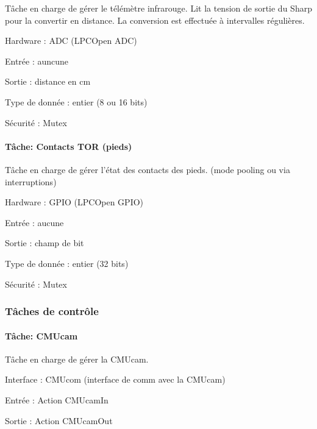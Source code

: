 Tâche en charge de gérer le télémètre infrarouge. Lit la tension de sortie du Sharp pour la convertir en distance. La conversion est effectuée à intervalles régulières.


\begin{DoxyItemize}
\item Hardware \-: A\-D\-C (L\-P\-C\-Open A\-D\-C)
\item Entrée \-: auncune
\item Sortie \-: distance en cm
\begin{DoxyItemize}
\item Type de donnée \-: entier (8 ou 16 bits)
\item Sécurité \-: Mutex
\end{DoxyItemize}
\end{DoxyItemize}

\paragraph*{Tâche\-: Contacts T\-O\-R (pieds)}

Tâche en charge de gérer l'état des contacts des pieds. (mode pooling ou via interruptions)


\begin{DoxyItemize}
\item Hardware \-: G\-P\-I\-O (L\-P\-C\-Open G\-P\-I\-O)
\item Entrée \-: aucune
\item Sortie \-: champ de bit
\begin{DoxyItemize}
\item Type de donnée \-: entier (32 bits)
\item Sécurité \-: Mutex
\end{DoxyItemize}
\end{DoxyItemize}

\subsubsection*{Tâches de contrôle}

\paragraph*{Tâche\-: C\-M\-Ucam}

Tâche en charge de gérer la C\-M\-Ucam.


\begin{DoxyItemize}
\item Interface \-: C\-M\-Ucom (interface de comm avec la C\-M\-Ucam)
\item Entrée \-: Action C\-M\-Ucam\-In
\item Sortie \-: Action C\-M\-Ucam\-Out
\end{DoxyItemize}

